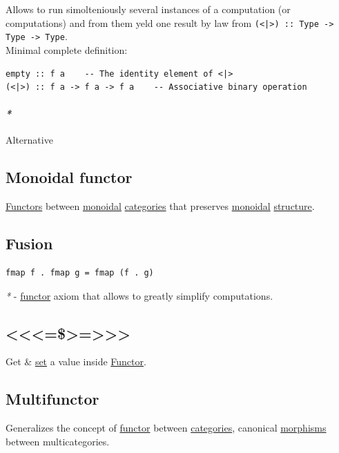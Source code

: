 \documentclass[a4paper,14pt,oneside]{book}
\begin{document}
Allows to run simolteniously several instances of a computation (or computations) and from them yeld one result by law from \texttt{(<|>) :: Type -> Type -> Type}.\\

Minimal complete definition:\\
\begin{verbatim}
empty :: f a    -- The identity element of <|>
(<|>) :: f a -> f a -> f a    -- Associative binary operation
\end{verbatim}

\paragraph{\emph{*}}
\label{sec:org3681ab5}

\label{orgc0b34e7}Alternative\\

\subsection{\label{org7dfb05b}Monoidal functor}
\label{sec:org594a07c}
\hyperref[org990398b]{Functors} between \hyperref[org076d777]{monoidal} \hyperref[orge6da866]{categories} that preserves \hyperref[org076d777]{monoidal} \hyperref[org2f999c6]{structure}.\\

\subsection{\label{org4d864a3}Fusion}
\label{sec:orgb21550d}
\begin{verbatim}
fmap f . fmap g = fmap (f . g)
\end{verbatim}

\emph{*} - \hyperref[orgd7350b0]{functor} axiom that allows to greatly simplify computations.\\

\subsection{<<<=\$>=>>>}
\label{sec:orgd69f701}
Get \& \hyperref[orgea3d2d2]{set} a value inside \hyperref[orgd7350b0]{Functor}.\\

\subsection{\label{orgd083257}Multifunctor}
\label{sec:org448be8b}
Generalizes the concept of \hyperref[orgd7350b0]{functor} between \hyperref[orge6da866]{categories}, canonical \hyperref[org19cb6ec]{morphisms} between multicategories.\\
\end{document}
